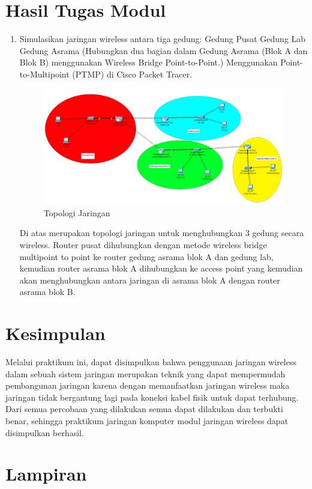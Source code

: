 \section{Hasil Tugas Modul}
\begin{enumerate}
	\item Simulasikan jaringan wireless antara tiga gedung:
	Gedung Pusat
	Gedung Lab
	Gedung Asrama (Hubungkan dua bagian dalam Gedung Asrama (Blok A dan Blok B) menggunakan Wireless Bridge Point-to-Point.)
	Menggunakan Point-to-Multipoint (PTMP) di Cisco Packet Tracer.\\
	\begin{figure}[H]
		\centering
		\includegraphics[scale=0.5]{P3/img/tumod.png}
		\caption{Topologi Jaringan}
	\end{figure}
	Di atas merupakan topologi jaringan untuk menghubungkan 3 gedung secara wireless. Router pusat dihubungkan dengan metode wireless bridge multipoint to point ke router gedung asrama blok A dan gedung lab, kemudian router asrama blok A dihubungkan ke access point yang kemudian akan menghubungkan antara jaringan di asrama blok A dengan router asrama blok B.
\end{enumerate}

\section{Kesimpulan}
Melalui praktikum ini, dapat disimpulkan bahwa penggunaan jaringan wireless dalam sebuah sistem jaringan merupakan teknik yang dapat mempermudah pembangunan jaringan karena dengan memanfaatkan jaringan wireless maka jaringan tidak bergantung lagi pada koneksi kabel fisik untuk dapat terhubung. Dari semua percobaan yang dilakukan semua dapat dilakukan dan terbukti benar, sehingga praktikum jaringan komputer modul jaringan wireless dapat disimpulkan berhasil.

\section{Lampiran}
